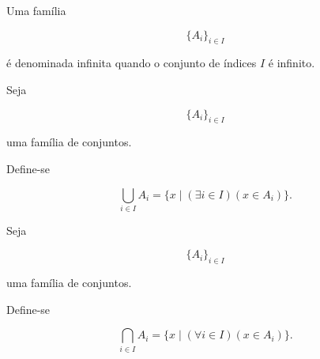 \documentclass[../../main]{subfiles}
\begin{document}
\begin{defn}
	\label{def:matematica:teoria-conjuntos:familias-de-conjuntos:familia-infinita}

	Uma família

	\[
		\{A_i\}_{i\in I}
	\]

	é denominada infinita quando o conjunto de índices \(I\) é infinito.

\end{defn}

\begin{defn}
	\label{def:matematica:teoria-conjuntos:familias-de-conjuntos:uniao-arbitraria}

	Seja

	\[
		\{A_i\}_{i\in I}
	\]

	uma família de conjuntos.

	Define-se

	\[
		\bigcup_{i\in I}A_i
		=
		\{
		x
		\mid
		(\exists i\in I)
		(x\in A_i)
		\}.
	\]

\end{defn}

\begin{defn}
	\label{def:matematica:teoria-conjuntos:familias-de-conjuntos:intersecao-arbitraria}

	Seja

	\[
		\{A_i\}_{i\in I}
	\]

	uma família de conjuntos.

	Define-se

	\[
		\bigcap_{i\in I}A_i
		=
		\{
		x
		\mid
		(\forall i\in I)
		(x\in A_i)
		\}.
	\]

\end{defn}
\end{document}
